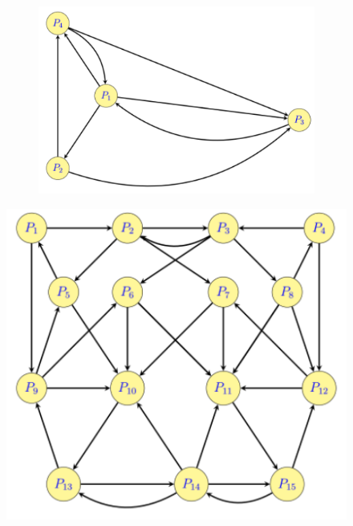 \documentclass[a4paper,10pt]{report}
\begin{document}
\begin{figure}[H]
   \begin{minipage}[c]{.48\linewidth}
   \begin{figure}[H]
   \includegraphics[width=\textwidth]{config4.png}
   \end{figure}
   \end{minipage} \hfill
   \begin{minipage}[c]{.48\linewidth}
   \includegraphics[width=\textwidth]{config5.png}
   \end{minipage}
\end{figure}
\end{document}
